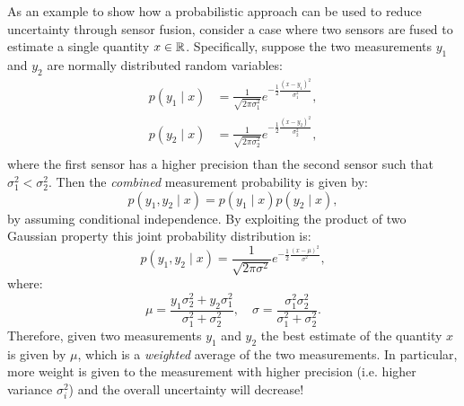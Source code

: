 \begin{example} \label{ex:competitive}
\theoremstyle{definition}
As an example to show how a probabilistic approach can be used to reduce uncertainty through sensor fusion, consider a case where two sensors are fused to estimate a single quantity $x\in \mathbb{R}$. Specifically, suppose the two measurements $y_1$ and $y_2$ are normally distributed random variables:
\begin{equation*}
\begin{split}
p(y_1 \mid x) &= \frac{1}{\sqrt{2\pi \sigma_1^2}} e^{-\frac{1}{2}\frac{(x-y_1)^2}{\sigma_1^2}}, \\ 
p(y_2 \mid x) &= \frac{1}{\sqrt{2\pi \sigma_2^2}} e^{-\frac{1}{2}\frac{(x-y_2)^2}{\sigma_2^2}}, \\ 
\end{split}
\end{equation*}
where the first sensor has a higher precision than the second sensor such that $\sigma_1^2 < \sigma_2^2$. Then the \textit{combined} measurement probability is given by:
\begin{equation*}
p(y_1, y_2 \mid x) = p(y_1 \mid x)p(y_2 \mid x),
\end{equation*}
by assuming conditional independence. By exploiting the product of two Gaussian property this joint probability distribution is:
\begin{equation*}
p(y_1, y_2 \mid x) = \frac{1}{\sqrt{2\pi \sigma^2}} e^{-\frac{1}{2}\frac{(x-\mu)^2}{\sigma^2}},
\end{equation*}
where:
\begin{equation*}
\mu = \frac{y_1\sigma_2^2 + y_2\sigma_1^2}{\sigma_1^2 + \sigma_2^2}, \quad \sigma = \frac{\sigma_1^2 \sigma_2^2}{\sigma_1^2 + \sigma_2^2}.
\end{equation*}
Therefore, given two measurements $y_1$ and $y_2$ the best estimate of the quantity $x$ is given by $\mu$, which is a \textit{weighted} average of the two measurements. In particular, more weight is given to the measurement with higher precision (i.e. higher variance $\sigma_i^2$) and the overall uncertainty will decrease!
\end{example}



